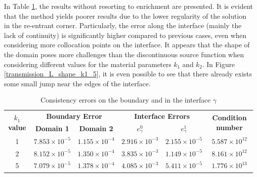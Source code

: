 In Table \ref{tab:transmission_results_L_shape_rectangles}, the results without resorting to enrichment are presented. It is evident that the method yields poorer results due to the lower regularity of the solution in the re-entrant corner. Particularly, the error along the interface (mainly the lack of continuity) is significantly higher compared to previous cases, even when considering more collocation points on the interface. It appears that the shape of the domain poses more challenges than the discontinuous source function when considering different values for the material parameters \(k_1\) and \(k_2\). In Figure \ref{transmission_L_shape_k1_5}, it is even possible to see that there already exists some small jump near the edges of the interface.

\begin{table}[!htbp]
    \centering
    \begin{tabular}{cccccc}
      \toprule
      \multirow{2}{*}{\textbf{\(k_1\) value}} & \multicolumn{2}{c}{\textbf{Boundary Error}} & \multicolumn{2}{c}{\textbf{Interface Errors}} & \multirow{2}{*}{\textbf{Condition number}} \\
      \cmidrule(lr){2-3} \cmidrule(lr){4-5}
      & \textbf{Domain 1} & \textbf{Domain 2} & \textbf{\(e_\gamma^0\)} & \textbf{\(e_\gamma^1\)} & \\
      \midrule
      1 & $7.853\times10^{-5}$ & $1.155\times10^{-4}$ & $2.916\times10^{-3}$ & $2.155\times10^{-5}$ & $5.587\times 10^{12}$ \\
      2 & $8.152\times10^{-5}$ & $1.350\times10^{-4}$ & $3.835\times10^{-3}$ & $1.149\times10^{-5}$ & $8.161\times 10^{12}$ \\
      5 & $7.079\times10^{-5}$ & $1.378\times10^{-4}$ & $4.085\times10^{-3}$ & $5.411\times10^{-5}$ & $1.776\times 10^{13}$ \\
      \bottomrule
    \end{tabular}
    \caption{Consistency errors on the boundary and in the interface \(\gamma\)}
    \label{tab:transmission_results_L_shape_rectangles}
\end{table}


